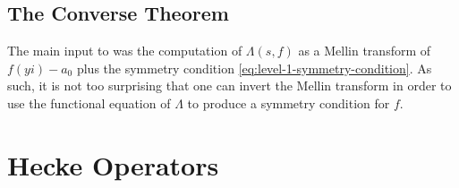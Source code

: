 \documentclass{amsart}
\begin{document}
\subsection{The Converse Theorem}
The main input to  was the computation of $\Lambda(s,f)$ as a Mellin transform of $f(yi)-a_0$ plus the symmetry condition \eqref{eq:level-1-symmetry-condition}. As such, it is not too surprising that one can invert the Mellin transform in order to use the functional equation of $\Lambda$ to produce a symmetry condition for $f$.\todo{}

\section{Hecke Operators}

\end{document}
